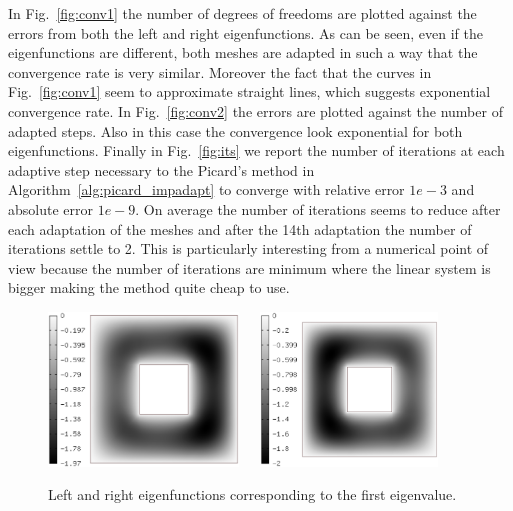 \documentclass[smallextended]{svjour3}
\begin{document}
In Fig.~\ref{fig:conv1} the number of degrees of freedoms are plotted against the errors from both the left and right eigenfunctions. As can be seen, even if the eigenfunctions are different, both meshes are adapted in such a way that the convergence rate is very similar. Moreover the fact that the curves in Fig.~\ref{fig:conv1} seem to approximate straight lines, which suggests exponential convergence rate. In Fig.~\ref{fig:conv2} the errors are plotted against the number of adapted steps. Also in this case the convergence look exponential for both eigenfunctions.
Finally in Fig.~\ref{fig:its} we report the number of iterations at each adaptive step necessary to the Picard's method in Algorithm~\ref{alg:picard_impadapt} to converge with relative error $1e-3$ and absolute error $1e-9$.
On average the number of iterations seems to reduce after each adaptation of the meshes and after the 14th adaptation the number of iterations settle to 2. This is particularly interesting from a numerical point of view because the number of iterations are minimum where the linear system is bigger making the method quite cheap to use.

\begin{figure}[!ht]
\begin{center}
\includegraphics[width=0.45\textwidth]{hole1.eps}\ \ \ 
\includegraphics[width=0.42\textwidth]{hole2.eps}
\end{center}
\caption{Left and right eigenfunctions corresponding to the first eigenvalue.}
\label{fig:holef}
\end{figure}
\end{document}
